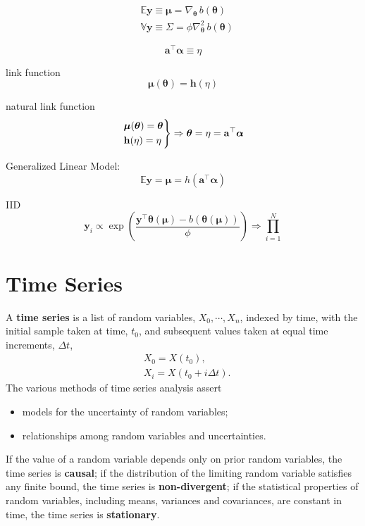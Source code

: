 \documentclass[12pt, twoside, draft]{article}
\begin{document}
\begin{align}
&\mathbb{E} \mathbf{y} \equiv \boldsymbol{\mu} = \nabla_{\boldsymbol{\theta}} \, b(\boldsymbol{\theta}) \\
&\mathbb{V} \mathbf{y} \equiv \Sigma = \phi \nabla^2_{\boldsymbol{\theta}} \, b(\boldsymbol{\theta})
\end{align}


\begin{equation}
\mathbf{a}^\top\boldsymbol{\alpha} \equiv \eta
\end{equation}


link function
\begin{equation}
\boldsymbol{\mu}(\boldsymbol{\theta}) = \mathbf{h}(\eta)
\end{equation}

natural link function
\begin{equation}
\begin{rcases}
\boldsymbol{\mu}(\boldsymbol{\theta}) = \boldsymbol{\theta} \\
\mathbf{h}(\eta) = \eta
\end{rcases} \Rightarrow
\boldsymbol{\theta} = \eta = \mathbf{a}^\top\boldsymbol{\alpha}
\end{equation}


Generalized Linear Model:
\begin{equation}
\mathbb{E}\mathbf{y} = \boldsymbol{\mu} = h(\mathbf{a}^\top \boldsymbol{\alpha})
\end{equation}


IID 
\begin{equation}
\mathbf{y}_i \propto\exp \left( \frac{\mathbf{y}^\top \boldsymbol{\theta}(\boldsymbol{\mu}) - b(\boldsymbol{\theta}(\boldsymbol{\mu}))}{\phi} \right) \Rightarrow \prod_{i = 1}^N 
\end{equation}



\section{Time Series}\label{sec:time_series}
A \textbf{time series} is a list of random variables, $X_0, \cdots, X_n$, indexed by time, with the initial sample taken at time, $t_0$, and subsequent values taken at equal time increments, $\Delta t$,
\begin{align}
&X_0 = X(t_0), \\
&X_i = X(t_0 + i \Delta t).
\end{align}
The various methods of time series analysis assert
\begin{itemize}[noitemsep]
\item models for the uncertainty of random variables;
\item relationships among random variables and uncertainties.
\end{itemize}
If the value of a random variable depends only on prior random variables, the time series is \textbf{causal}; if the distribution of the limiting random variable satisfies any finite bound, the time series is \textbf{non-divergent}; if the statistical properties of random variables, including means, variances and covariances, are constant in time, the time series is \textbf{stationary}.  
\end{document}
